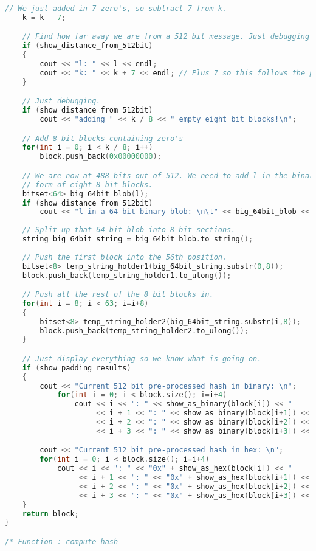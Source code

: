 \begin{lstlisting}[language = C++]
	// We just added in 7 zero's, so subtract 7 from k.
	k = k - 7;

	// Find how far away we are from a 512 bit message. Just debugging.
	if (show_distance_from_512bit)
	{
		cout << "l: " << l << endl;
		cout << "k: " << k + 7 << endl; // Plus 7 so this follows the paper.
	}

	// Just debugging.
	if (show_distance_from_512bit)
		cout << "adding " << k / 8 << " empty eight bit blocks!\n";

	// Add 8 bit blocks containing zero's
	for(int i = 0; i < k / 8; i++)
		block.push_back(0x00000000);

	// We are now at 488 bits out of 512. We need to add l in the binary
	// form of eight 8 bit blocks.
	bitset<64> big_64bit_blob(l);
	if (show_distance_from_512bit)
		cout << "l in a 64 bit binary blob: \n\t" << big_64bit_blob << endl;
	
	// Split up that 64 bit blob into 8 bit sections.
	string big_64bit_string = big_64bit_blob.to_string();
	
	// Push the first block into the 56th position.
	bitset<8> temp_string_holder1(big_64bit_string.substr(0,8));
	block.push_back(temp_string_holder1.to_ulong());

	// Push all the rest of the 8 bit blocks in.
	for(int i = 8; i < 63; i=i+8)
	{
		bitset<8> temp_string_holder2(big_64bit_string.substr(i,8));
		block.push_back(temp_string_holder2.to_ulong());
	}

	// Just display everything so we know what is going on.
	if (show_padding_results)
	{
		cout << "Current 512 bit pre-processed hash in binary: \n";
			for(int i = 0; i < block.size(); i=i+4)
				cout << i << ": " << show_as_binary(block[i]) << "     " 
				     << i + 1 << ": " << show_as_binary(block[i+1]) << "     " 
				     << i + 2 << ": " << show_as_binary(block[i+2]) << "     " 
				     << i + 3 << ": " << show_as_binary(block[i+3]) << endl;

		cout << "Current 512 bit pre-processed hash in hex: \n";
		for(int i = 0; i < block.size(); i=i+4)
			cout << i << ": " << "0x" + show_as_hex(block[i]) << "     " 
			     << i + 1 << ": " << "0x" + show_as_hex(block[i+1]) << "     " 
			     << i + 2 << ": " << "0x" + show_as_hex(block[i+2]) << "     " 
			     << i + 3 << ": " << "0x" + show_as_hex(block[i+3]) << endl;	
	}
	return block;
}

/* Function : compute_hash


\end{lstlisting}
